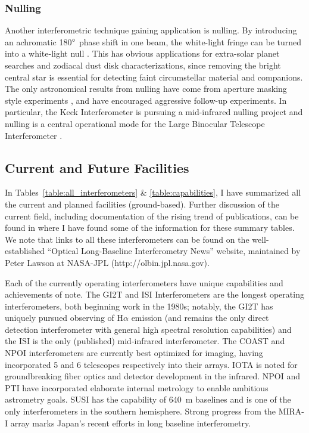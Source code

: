 \documentclass[12pt]{iopart}
\def\arcdegg{\hbox{$^\circ$}}
\begin{document}
\subsubsection{Nulling}
\label{nulling}
Another interferometric technique gaining application is nulling.  By
introducing an achromatic 180$\arcdegg$ phase shift in one beam, the
white-light fringe can be turned into a white-light null
\citep{bracewell1978}.  This has obvious applications for extra-solar
planet searches and zodiacal dust disk characterizations, since
removing the bright central star is essential for detecting faint
circumstellar material and companions.  The only astronomical results
from nulling have come from aperture masking style experiments
\citep[e.g.,][]{hinz1998,hinzthesis,hinz2001},  and have encouraged
aggressive follow-up experiments.  In particular, the Keck
Interferometer is pursuing a mid-infrared nulling project
\citep{serabyn2001} and nulling is a central operational mode for the
Large Binocular Telescope Interferometer \citep{hinz2001b}.  


\subsection{Current and Future Facilities}

\label{projects}
In Tables~\ref{table:all_interferometers} \& \ref{table:capabilities},
I have summarized all the current and planned facilities
(ground-based).  Further discussion of the current field, including
documentation of the rising trend of publications, can be found in
\citet{ridgway2000} where I have found some of the information for
these summary tables.  We note that links to all these interferometers
can be found on the well-established ``Optical Long-Baseline
Interferometry News'' website, maintained by Peter Lawson at NASA-JPL
(http://olbin.jpl.nasa.gov). 

Each of the currently operating interferometers have unique
capabilities and achievements of note.  The GI2T and ISI
Interferometers are the longest operating interferometers, both
beginning work in the 1980s; notably, the GI2T has uniquely pursued
observing of H$\alpha$ emission (and remains the only direct detection
interferometer with general high spectral resolution capabilities) and
the ISI is the only (published) mid-infrared interferometer. The COAST
and NPOI interferometers are currently best optimized for imaging,
having incorporated 5 and 6 telescopes respectively into their arrays.
IOTA is noted for groundbreaking fiber optics and detector development
in the infrared.  NPOI and PTI have incorporated elaborate internal
metrology to enable ambitious astrometry goals. SUSI has the
capability of 640~m baselines and is one of the only interferometers
in the southern hemisphere.  Strong progress from the MIRA-I array
marks Japan's recent efforts in long baseline interferometry.
\end{document}

